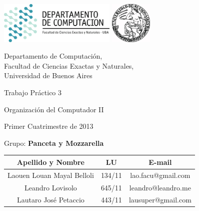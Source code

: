 \documentclass[a4paper,10pt,twoside]{article}
\begin{document}


\thispagestyle{caratula}

\begin{center}

\includegraphics[height=2cm]{DC.png} 
\hfill
\includegraphics[height=2cm]{UBA.jpg} 

\vspace{2cm}

Departamento de Computación,\\
Facultad de Ciencias Exactas y Naturales,\\
Universidad de Buenos Aires

\vspace{4cm}

\begin{Huge}
Trabajo Práctico 3
\end{Huge}

\vspace{0.5cm}

\begin{Large}
Organización del Computador II
\end{Large}

\vspace{1cm}

Primer Cuatrimestre de 2013

\vspace{4cm}

Grupo: \textbf{Panceta y Mozzarella}

\vspace{0.5cm}

\begin{tabular}{|c|c|c|}
\hline
Apellido y Nombre & LU & E-mail\\
\hline
Laouen Louan Mayal Belloli  & 134/11 & lao.facu@gmail.com\\
Leandro Lovisolo      		& 645/11 & leandro@leandro.me\\
Lautaro José Petaccio 		& 443/11 & lausuper@gmail.com\\
\hline
\end{tabular}

\end{center}
\end{document}
